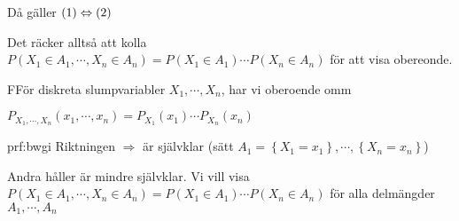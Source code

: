 \par\bigskip
\noindent Då gäller $(1)\Leftrightarrow (2)$\par
\noindent Det räcker alltså att kolla $P(X_1\in A_1,\cdots, X_n\in A_n) = P(X_1\in A_1)\cdots P(X_n\in A_n)$ för att visa obereonde.
\newpage
\begin{theo}
  FFör diskreta slumpvariabler $X_1,\cdots, X_n$, har vi oberoende omm\par
  \noindent $P_{X_1,\cdots,X_n}(x_1,\cdots,x_n) = P_{X_1}(x_1)\cdots P_{X_n}(x_n)$ 
\end{theo}
\par\bigskip
\begin{prf}{prf:bwgi}
  Riktningen $\Rightarrow$ är självklar (sätt $A_1 = \left\{X_1=x_1\right\},\cdots,\left\{X_n=x_n\right\}$)
  \par\bigskip
  \noindent Andra håller är mindre självklar. Vi vill visa $P(X_1\in A_1,\cdots, X_n\in A_n) = P(X_1\in A_1)\cdots P(X_n\in A_n)$ för alla delmängder $A_1,\cdots, A_n$
\end{prf}
